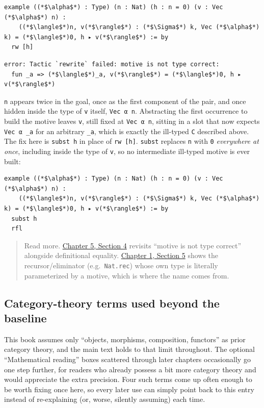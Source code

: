 \begin{lstlisting}
example ((*$\alpha$*) : Type) (n : Nat) (h : n = 0) (v : Vec (*$\alpha$*) n) :
    ((*$\langle$*)n, v(*$\rangle$*) : (*$\Sigma$*) k, Vec (*$\alpha$*) k) = (*$\langle$*)0, h ▸ v(*$\rangle$*) := by
  rw [h]
\end{lstlisting}

\begin{lstlisting}
error: Tactic `rewrite` failed: motive is not type correct:
  fun _a => (*$\langle$*)_a, v(*$\rangle$*) = (*$\langle$*)0, h ▸ v(*$\rangle$*)
\end{lstlisting}

\texttt{n} appears twice in the goal, once as the first component of the pair, and once hidden inside the type of \texttt{v} itself, \texttt{Vec α n}. Abstracting the first occurrence to build the motive leaves \texttt{v}, still fixed at \texttt{Vec α n}, sitting in a slot that now expects \texttt{Vec α \_\allowbreak{}a} for an arbitrary \texttt{\_\allowbreak{}a}, which is exactly the ill-typed \texttt{C} described above. The fix here is \texttt{subst h} in place of \texttt{rw [h]}. \texttt{subst} replaces \texttt{n} with \texttt{0} \emph{everywhere at once}, including inside the type of \texttt{v}, so no intermediate ill-typed motive is ever built:

\begin{lstlisting}
example ((*$\alpha$*) : Type) (n : Nat) (h : n = 0) (v : Vec (*$\alpha$*) n) :
    ((*$\langle$*)n, v(*$\rangle$*) : (*$\Sigma$*) k, Vec (*$\alpha$*) k) = (*$\langle$*)0, h ▸ v(*$\rangle$*) := by
  subst h
  rfl
\end{lstlisting}

\begin{quote}
Read more. \hyperref[sec:05-rigor-check:04-defeq-vs-propeq:1]{Chapter 5, Section 4} revisits ``motive is not type correct'' alongside definitional equality. \hyperref[sec:01-basics:05-pi-sigma-and-coc:1]{Chapter 1, Section 5} shows the recursor/eliminator (e.g.~\texttt{Nat.rec}) whose own type is literally parameterized by a motive, which is where the name comes from.
\end{quote}

\subsection{Category-theory terms used beyond the baseline}\label{sec:01-basics:04-terminology:6}

This book assumes only ``objects, morphisms, composition, functors'' as prior category theory, and the main text holds to that limit throughout. The optional ``Mathematical reading'' boxes scattered through later chapters occasionally go one step further, for readers who already possess a bit more category theory and would appreciate the extra precision. Four such terms come up often enough to be worth fixing once here, so every later use can simply point back to this entry instead of re-explaining (or, worse, silently assuming) each time.

